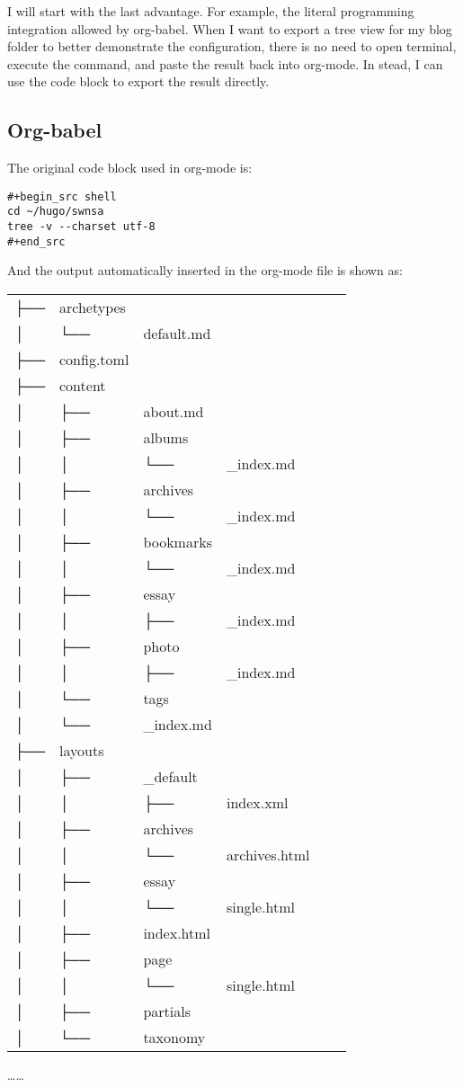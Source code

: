 \documentclass[11pt]{article}
\begin{document}
I will start with the last advantage. For example, the literal programming integration allowed by org-babel. When I want to export a tree view for my blog folder to better demonstrate the configuration, there is no need to open terminal, execute the command, and paste the result back into org-mode. In stead, I can use the code block to export the result directly. 

\subsection{Org-babel}
\label{sec:org1e3687f}
The original code block used in org-mode is:

\begin{verbatim}
#+begin_src shell
cd ~/hugo/swnsa
tree -v --charset utf-8
#+end_src
\end{verbatim}

And the output automatically inserted in the org-mode file is shown as:
\begin{center}
\begin{tabular}{llllll}
├── & archetypes &  &  &  & \\
│   & └── & default.md &  &  & \\
├── & config.toml &  &  &  & \\
├── & content &  &  &  & \\
│   & ├── & about.md &  &  & \\
│   & ├── & albums &  &  & \\
│   & │   & └── & \_index.md &  & \\
│   & ├── & archives &  &  & \\
│   & │   & └── & \_index.md &  & \\
│   & ├── & bookmarks &  &  & \\
│   & │   & └── & \_index.md &  & \\
│   & ├── & essay &  &  & \\
│   & │   & ├── & \_index.md &  & \\
│   & ├── & photo &  &  & \\
│   & │   & ├── & \_index.md &  & \\
│   & └── & tags &  &  & \\
│   & └── & \_index.md &  &  & \\
├── & layouts &  &  &  & \\
│   & ├── & \_default &  &  & \\
│   & │   & ├── & index.xml &  & \\
│   & ├── & archives &  &  & \\
│   & │   & └── & archives.html &  & \\
│   & ├── & essay &  &  & \\
│   & │   & └── & single.html &  & \\
│   & ├── & index.html &  &  & \\
│   & ├── & page &  &  & \\
│   & │   & └── & single.html &  & \\
│   & ├── & partials &  &  & \\
│   & └── & taxonomy &  &  & \\
\end{tabular}
\end{center}
\ldots{}\ldots{}
\end{document}
